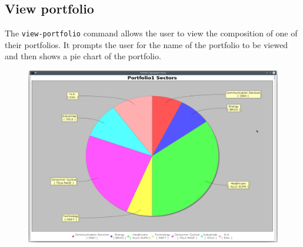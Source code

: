 \subsection{View portfolio}
The \texttt{view-portfolio} command allows the user to view the composition of
one of their portfolios. It prompts the user for the name of the portfolio to be
viewed and then shows a pie chart of the portfolio.
\begin{figure}[H]
	\begin{center}
		\includegraphics[scale=0.32]{img/user_manual/view_portfolio.png}
	\end{center}
\end{figure}
\restoregeometry
